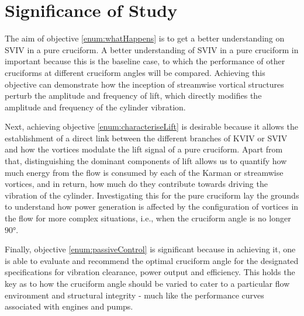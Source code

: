 \documentclass[oneside]{utmthesis}
\begin{document}
\section{Significance of Study} \label{sec:signStudy}
The aim of objective \ref{enum:whatHappens} is to get a better understanding on SVIV in a pure cruciform. A better understanding of SVIV in a pure cruciform in important because this is the baseline case, to which the performance of other cruciforms at different cruciform angles will be compared. Achieving this objective can demonstrate how the inception of streamwise vortical structures perturb the amplitude and frequency of lift, which directly modifies the amplitude and frequency of the cylinder vibration.

Next, achieving objective \ref{enum:characteriseLift} is desirable because it allows the establishment of a direct link between the different branches of KVIV or SVIV and how the vortices modulate the lift signal of a pure cruciform. Apart from that, distinguishing the dominant components of lift allows us to quantify how much energy from the flow is consumed by each of the Karman or streamwise vortices, and in return, how much do they contribute towards driving the vibration of the cylinder. Investigating this for the pure cruciform lay the grounds to understand how power generation is affected by the configuration of vortices in the flow for more complex situations, i.e., when the cruciform angle is no longer $90 \si{\degree}$.

Finally, objective \ref{enum:passiveControl} is significant because in achieving it, one is able to evaluate and recommend the optimal cruciform angle for the designated specifications for vibration clearance, power output and efficiency. This holds the key as to how the cruciform angle should be varied to cater to a particular flow environment and structural integrity - much like the performance curves associated with engines and pumps.

\end{document}
